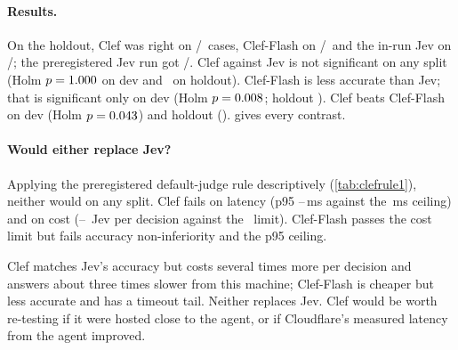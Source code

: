 \paragraph{Results.} On the holdout, Clef was right on \ClHoldClefAcc/\HoldN\ cases, Clef-Flash on \ClHoldFlashAcc/\HoldN\
and the in-run Jev on \ClHoldJevAcc/\HoldN; the preregistered Jev run got \JevHoldAccK/\HoldN. Clef against Jev is not
significant on any split (Holm $p = 1.000$ on dev and \ClHoldClefJevHolm\ on holdout). Clef-Flash is less
accurate than Jev; that is significant only on dev (Holm $p = 0.008$; holdout \ClHoldFlashJevHolm). Clef
beats Clef-Flash on dev (Holm $p = 0.043$) and holdout (\ClHoldClefFlashHolm). \Cref{tab:clefcontrasts}
gives every contrast.

\begin{table}[htbp]
\centering\scriptsize
\caption{Post-hoc paired contrasts (McNemar exact test on per-case majority). Holm over the rule-1 family of the two
new arms for comparisons with Jev, and over the pairwise family for Clef against Clef-Flash.}
\label{tab:clefcontrasts}

\end{table}

\paragraph{Would either replace Jev?} Applying the preregistered default-judge rule descriptively (\cref{tab:clefrule1}),
neither would on any split. Clef fails on latency (p95 \ClClefPninetyfiveLow--\ClClefPninetyfiveHigh\,ms against the
\ClRuleOneMaxPninetyfive\,ms ceiling) and on cost (\ClClefCostXLow--\ClClefCostXHigh\X\ Jev per decision against the
\ClRuleOneCostX\X\ limit). Clef-Flash passes the cost limit but fails accuracy non-inferiority and the p95 ceiling.

\begin{table}[htbp]
\centering\small
\caption{The preregistered default-judge rule applied descriptively to the post-hoc arms (NI: non-inferior to the
in-run Jev).}
\label{tab:clefrule1}

\end{table}

\begin{keyidea}
Clef matches Jev's accuracy but costs several times more per decision and answers about three times slower from
this machine; Clef-Flash is cheaper but less accurate and has a timeout tail. Neither replaces Jev. Clef would be
worth re-testing if it were hosted close to the agent, or if Cloudflare's measured latency from the agent improved.
\end{keyidea}
